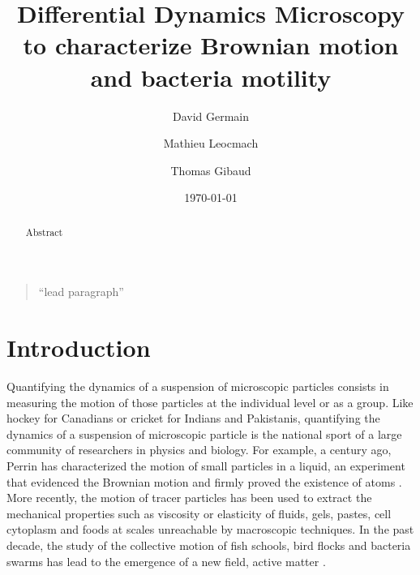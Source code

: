 \documentclass[%
 aip,
 jmp,%
 amsmath,amssymb,
reprint,%
]{revtex4-1}
\begin{document}

\title[Sample title]{Differential Dynamics Microscopy to characterize Brownian motion and bacteria motility}%

\author{David Germain}
\author{Mathieu Leocmach}
\author{Thomas Gibaud}

\date{\today}%

\begin{abstract}
Abstract
\end{abstract}

\maketitle

\begin{quotation}
``lead paragraph''
\end{quotation}

\section{\label{sec:level1}Introduction}

Quantifying the dynamics of a suspension of microscopic particles consists in measuring the motion of those particles at the individual level or as a group. Like hockey for Canadians or cricket for Indians and Pakistanis, quantifying the dynamics of a suspension of microscopic particle is the national sport of a large community of researchers in physics and biology. For example, a century ago, Perrin has characterized the motion of small particles in a liquid, an experiment that evidenced the Brownian motion and firmly proved the existence of atoms \cite{XXX}. More recently, the motion of tracer particles has been used to extract the mechanical properties such as viscosity or elasticity of fluids, gels, pastes, cell cytoplasm and foods at scales unreachable by macroscopic techniques\cite{XXX}. In the past decade, the study of the collective motion of fish schools, bird flocks and bacteria swarms has lead to the emergence of a new field, active matter \cite{XXX}.
\end{document}
